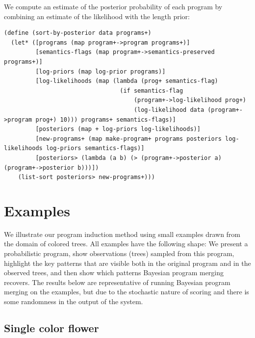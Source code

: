 \documentclass[a4paper,10pt]{article}
\begin{document}
We compute an estimate of the posterior probability of each program by combining an estimate of the likelihood with the length prior:
\begin{lstlisting}[frame=trbl]
(define (sort-by-posterior data programs+)
  (let* ([programs (map program+->program programs+)]
         [semantics-flags (map program+->semantics-preserved programs+)]
         [log-priors (map log-prior programs)]
         [log-likelihoods (map (lambda (prog+ semantics-flag)
                                 (if semantics-flag
                                     (program+->log-likelihood prog+)
                                     (log-likelihood data (program+->program prog+) 10))) programs+ semantics-flags)]
         [posteriors (map + log-priors log-likelihoods)] 
         [new-programs+ (map make-program+ programs posteriors log-likelihoods log-priors semantics-flags)]
         [posteriors> (lambda (a b) (> (program+->posterior a) (program+->posterior b)))])
    (list-sort posteriors> new-programs+)))
\end{lstlisting}


\newpage
\section{Examples}

We illustrate our program induction method using small examples drawn from the domain of colored trees. All examples have the following shape: We present a probabilistic program, show observations (trees) sampled from this program, highlight the key patterns that are visible both in the original program and in the observed trees, and then show which patterns Bayesian program merging recovers.  The results below are representative of running Bayesian program merging on the examples, but due to the stochastic nature of scoring and there is some randomness in the output of the system.

\subsection{Single color flower}
\end{document}
